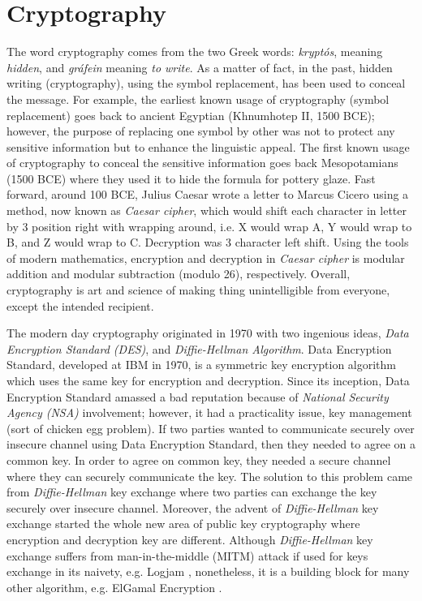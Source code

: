  
\section{Cryptography}
\label{sec:cryptography}
    The word cryptography comes from the two Greek words: 
    \textit{krypt\'{o}s}, meaning \textit{hidden}, and \textit{gr\'{a}fein} meaning \textit{to write}. As a matter of 
    fact, in the past, hidden writing (cryptography), using the symbol replacement, has been used 
    to conceal the message. For example,
    the earliest known usage of cryptography (symbol replacement) goes back to  ancient 
    Egyptian (Khnumhotep {\rm II}, 1500 BCE); however, the purpose of replacing one symbol by other 
    was not to protect
    any sensitive information but to enhance the linguistic appeal. The first known usage of 
    cryptography to conceal the sensitive information goes back Mesopotamians (1500 BCE) where 
    they used it to hide the formula for pottery glaze. Fast forward, around 100 BCE, 
    Julius Caesar wrote a letter to Marcus  Cicero using a method, now known 
    as \textit{Caesar cipher}, which would shift each character in letter by 3 position right with wrapping 
    around, i.e. X would wrap A, Y would wrap to B, and Z would wrap to C. Decryption was 
	3 character left shift.  Using the  tools of modern mathematics, encryption and decryption 
	in \textit{Caesar cipher} is modular addition and modular subtraction (modulo 26), respectively.  
    Overall, cryptography is art and science of making thing  unintelligible from everyone, except the 
    intended recipient.  	
	    
	The modern day cryptography originated in 1970 with two ingenious ideas, \textit{Data Encryption Standard (DES)}, 
	and \textit{Diffie-Hellman Algorithm}. Data Encryption Standard, developed at IBM in 1970, is a symmetric 
	key encryption algorithm which uses the same key for encryption and decryption. Since its inception, Data Encryption Standard
	amassed a bad reputation because of \textit{National Security Agency (NSA)} involvement; however, it had a 
	practicality issue, key management (sort of chicken egg problem). If two parties wanted to communicate
	securely over insecure channel using Data Encryption Standard, then they needed to agree on a common key. 
	In order to agree on common key, they needed a secure channel where they can securely communicate the key. 
    The solution to this problem came from \textit{Diffie-Hellman} key exchange where two parties can exchange the 
    key securely over insecure channel. Moreover, the advent of \textit{Diffie-Hellman} key exchange started the 
    whole new area of public key cryptography where encryption and decryption key are different. 
    Although \textit{Diffie-Hellman} key exchange suffers from  man-in-the-middle (MITM)  attack if used for keys exchange in its 
    naivety, e.g. Logjam \citep{Adrian:2015:IFS:2810103.2813707}, nonetheless, 
    it is a building block for many other algorithm, e.g. ElGamal Encryption \citep{elgamal1985public}. 
    
